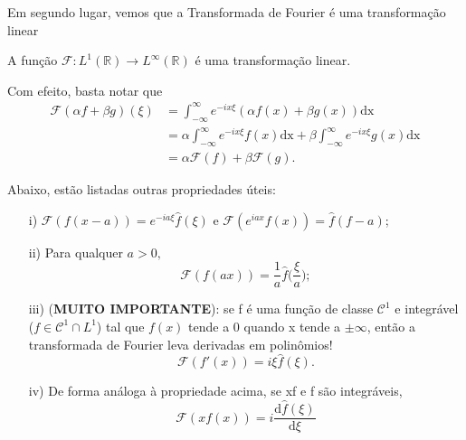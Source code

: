 \documentclass[../pde_notes.tex]{subfiles}
\begin{document}
Em segundo lugar, vemos que a Transformada de Fourier é uma transformação linear
\begin{prop*}
	A função \(\mathcal{F}:L^{1}(\mathbb{R})\rightarrow L^{\infty}(\mathbb{R})\) é uma transformação linear.
\end{prop*}
\begin{proof*}
	Com efeito, basta notar que
	\begin{align*}
		\mathcal{F}(\alpha f + \beta g)(\xi ) & =\int_{-\infty}^{\infty}e^{-ix\xi }(\alpha f(x)+\beta g(x)) \mathrm{dx}                                                \\
		                                      & = \alpha \int_{-\infty}^{\infty}e^{-ix\xi }f(x) \mathrm{dx} + \beta \int_{-\infty}^{\infty}e^{-ix\xi }g(x) \mathrm{dx} \\
		                                      & = \alpha \mathcal{F}(f) + \beta \mathcal{F}(g).
	\end{align*}
\end{proof*}
\begin{prop*}
	Abaixo, estão listadas outras propriedades úteis:
	\begin{itemize}
		\item[i)] \(\mathcal{F}(f(x-a))=e^{-ia\xi }\hat{f}(\xi )\) e \(\mathcal{F}(e^{iax}f(x))=\hat{f}(f-a)\);
		\item[ii)] Para qualquer \(a > 0,\)
		      \[
			      \mathcal{F}(f(ax)) = \frac{1}{a}\hat{f}\biggl(\frac{\xi }{a}\biggr);
		      \]
		\item[iii)](\textbf{MUITO IMPORTANTE}): se f é uma função de classe \(\mathcal{C}^{1}\) e integrável (\(f\in \mathcal{C}^{1}\cap L^{1}\)) tal que \(f(x)\) tende a 0 quando x tende a \(\pm \infty\), então a transformada de Fourier leva derivadas em polinômios!
		      \[
			      \mathcal{F}(f'(x)) = i\xi \hat{f}(\xi ).
		      \]
		\item[iv)] De forma análoga à propriedade acima, se xf e f são integráveis,
		      \[
			      \mathcal{F}(xf(x)) = i \frac{\mathrm{d}\hat{f}(\xi )}{\mathrm{d}\xi }
		      \]
	\end{itemize}
\end{prop*}
\end{document}
